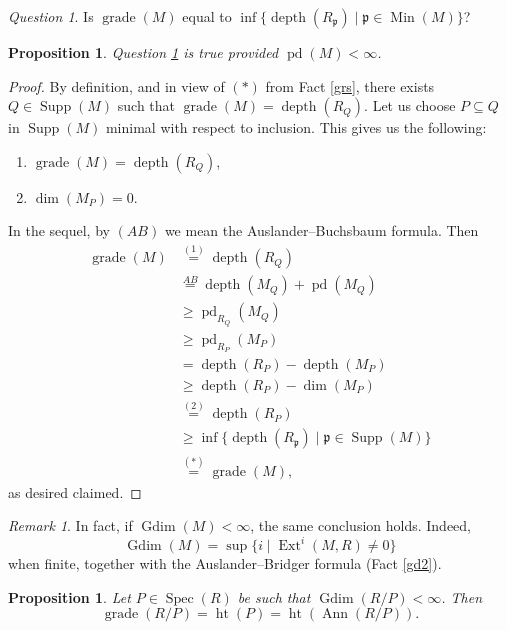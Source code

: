 \documentclass[11.05pt,a4paper]{amsart}
\newtheorem{proposition}[theorem]{Proposition}
\theoremstyle{definition}
\theoremstyle{remark}
\newtheorem{remark}[theorem]{Remark}\newtheorem{fact}[theorem]{Fact}
\newtheorem{question}[theorem]{Question}
\newcommand{\grade}{\operatorname{grade}}
\newcommand{\Min}{\operatorname{Min}}
\newcommand{\Spec}{\operatorname{Spec}}
\newcommand{\pd}{\operatorname{pd}}
\newcommand{\Gdim}{\operatorname{Gdim}}
\newcommand{\Ext}{\operatorname{Ext}}
\newcommand{\Supp}{\operatorname{Supp}}
\newcommand{\Ann}{\operatorname{Ann}}
\newcommand{\depth}{\operatorname{depth}}
\begin{document}
\begin{question}\label{6.1}
	Is $\grade(M)$ equal to $\inf\{ \depth(R_{\mathfrak{p}}) \mid \mathfrak{p} \in \Min(M) \}$?
\end{question}

\begin{proposition}
	Question \ref{6.1} is true provided $\pd(M) < \infty$.
\end{proposition}

\begin{proof}
By definition, and in view of $(\ast)$ from Fact \ref{grs}, there exists $Q \in \Supp(M)$ such that $\grade(M) = \depth(R_Q)$.  
Let us choose $P \subseteq Q$ in $\Supp(M)$ minimal with respect to inclusion. This gives us the following:
\begin{enumerate}
	\item $\grade(M) = \depth(R_Q)$, 
	\item $\dim(M_P)=0$.
\end{enumerate}
In the sequel, by $(AB)$ we mean the Auslander--Buchsbaum formula. Then
	\begin{align*}	 
	\grade(M)
	&\stackrel{(1)}= \depth(R_Q) \\
	&\stackrel{AB}= \depth(M_Q) + \pd(M_Q)\\
	&\geq \pd_{R_Q}(M_Q) \\
	&\geq \pd_{R_P}(M_P)\\
	&= \depth(R_P) - \depth(M_P) \\
	&\geq \depth(R_P) - \dim(M_P)\\
	&\stackrel{(2)}= \depth(R_P)\\
	&\geq\inf\{\depth(R_{\mathfrak{p}}) \mid \mathfrak{p} \in \Supp(M)\}\\
	&\stackrel{(\ast)}=\grade(M),
	\end{align*}as desired claimed.
\end{proof}

\begin{remark}\label{98}
	In fact, if $\Gdim(M) < \infty$, the same conclusion holds. Indeed,
	\[
	\Gdim(M) = \sup\{ i \mid \Ext^i(M,R) \neq 0 \}
	\]
	when finite, together with the Auslander–Bridger formula (Fact \ref{gd2}).
\end{remark}

\begin{proposition}\label{99a}
	Let $P \in \Spec(R)$ be such that $\Gdim(R/P) < \infty$. Then
	\[
	\grade(R/P) = \operatorname{ht}(P) = \operatorname{ht}(\Ann(R/P)).
	\]
\end{proposition}
\end{document}
